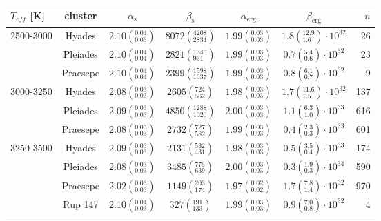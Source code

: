 \begin{tabular}{lcccccr}
\hline
 $T_{eff}$ [K] & cluster &            $\alpha_\mathrm{s}$ &                 $\beta_\mathrm{s}$ &              $\alpha_\mathrm{erg}$ &                          $\beta_\mathrm{erg}$ &  $n$ \\
\hline
2500-3000 & Hyades &  $2.10\left(^{0.04}_{0.03}\right)$ &  $8072\left(^{4208}_{2834}\right)$ &  $1.99\left(^{0.03}_{0.03}\right)$ &  $1.8\left(^{12.9}_{1.6}\right)\cdot 10^{32}$ &   26 \\
          & Pleiades &  $2.10\left(^{0.04}_{0.04}\right)$ &   $2821\left(^{1346}_{931}\right)$ &  $1.99\left(^{0.03}_{0.03}\right)$ &   $0.7\left(^{5.4}_{0.6}\right)\cdot 10^{32}$ &   23 \\
          & Praesepe &  $2.10\left(^{0.04}_{0.04}\right)$ &  $2399\left(^{1598}_{1037}\right)$ &  $1.99\left(^{0.03}_{0.03}\right)$ &   $0.8\left(^{6.1}_{0.7}\right)\cdot 10^{32}$ &    9 \\
3000-3250 & Hyades &  $2.08\left(^{0.03}_{0.03}\right)$ &    $2605\left(^{724}_{562}\right)$ &  $1.98\left(^{0.03}_{0.03}\right)$ &  $1.7\left(^{11.6}_{1.5}\right)\cdot 10^{32}$ &  137 \\
          & Pleiades &  $2.09\left(^{0.03}_{0.03}\right)$ &  $4850\left(^{1288}_{1020}\right)$ &  $2.00\left(^{0.03}_{0.03}\right)$ &   $1.1\left(^{6.3}_{1.0}\right)\cdot 10^{33}$ &  616 \\
          & Praesepe &  $2.08\left(^{0.03}_{0.03}\right)$ &    $2732\left(^{727}_{582}\right)$ &  $1.99\left(^{0.03}_{0.03}\right)$ &   $0.4\left(^{2.3}_{0.3}\right)\cdot 10^{33}$ &  601 \\
3250-3500 & Hyades &  $2.09\left(^{0.03}_{0.03}\right)$ &    $2131\left(^{532}_{431}\right)$ &  $1.98\left(^{0.03}_{0.03}\right)$ &   $0.5\left(^{3.5}_{0.4}\right)\cdot 10^{33}$ &  174 \\
          & Pleiades &  $2.08\left(^{0.03}_{0.03}\right)$ &    $3485\left(^{775}_{639}\right)$ &  $2.00\left(^{0.03}_{0.03}\right)$ &   $0.3\left(^{1.9}_{0.3}\right)\cdot 10^{34}$ &  590 \\
          & Praesepe &  $2.02\left(^{0.03}_{0.03}\right)$ &    $1149\left(^{203}_{174}\right)$ &  $1.97\left(^{0.02}_{0.02}\right)$ &   $1.7\left(^{7.8}_{1.4}\right)\cdot 10^{32}$ &  970 \\
          & Rup 147 &  $2.10\left(^{0.04}_{0.03}\right)$ &     $327\left(^{191}_{133}\right)$ &  $1.99\left(^{0.03}_{0.03}\right)$ &   $0.9\left(^{7.0}_{0.8}\right)\cdot 10^{32}$ &    4 \\

\end{tabular}
